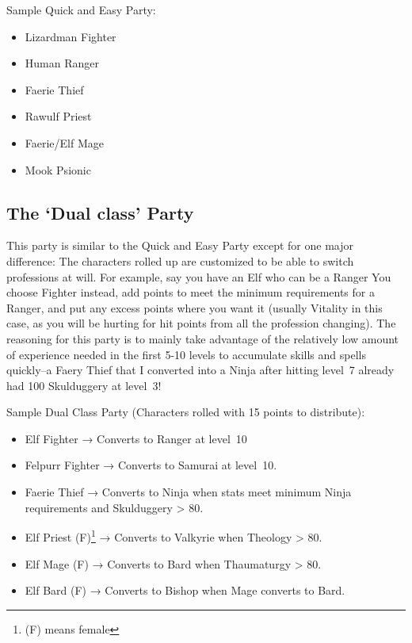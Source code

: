 \documentclass[12pt]{article}
\providecommand{\tightlist}{%
  \setlength{\itemsep}{0pt}\setlength{\parskip}{0pt}}
\begin{document}
Sample Quick and Easy Party:

\begin{itemize}
\tightlist
\item
  Lizardman Fighter
\item
  Human Ranger
\item
  Faerie Thief
\item
  Rawulf Priest
\item
  Faerie/Elf Mage
\item
  Mook Psionic
\end{itemize}

\subsection{\texorpdfstring{The `Dual class'
Party}{The Dual class Party}}\label{the-dual-class-party}

This party is similar to the Quick and Easy Party except for one major
difference: The characters rolled up are customized to be able to switch
professions at will. For example, say you have an Elf who can be a
Ranger You choose Fighter instead, add points to meet the minimum
requirements for a Ranger, and put any excess points where you want it
(usually Vitality in this case, as you will be hurting for hit points
from all the profession changing). The reasoning for this party is to
mainly take advantage of the relatively low amount of experience needed
in the first 5-10 levels to accumulate skills and spells quickly--a
Faery Thief that I converted into a Ninja after hitting level~7 already
had 100 Skulduggery at level~3!

Sample Dual Class Party (Characters rolled with 15 points to distribute):

\begin{itemize}
\tightlist
\item
  Elf Fighter → Converts to Ranger at level~10
\item
  Felpurr Fighter → Converts to Samurai at level~10.
\item
  Faerie Thief → Converts to Ninja when stats meet minimum Ninja
  requirements and Skulduggery \textgreater{} 80.
\item
  Elf Priest (F)\protect\footnote{(F) means female} → Converts to Valkyrie when Theology \textgreater{} 80.
\item
  Elf Mage (F) → Converts to Bard when Thaumaturgy \textgreater{} 80.
\item
  Elf Bard (F) → Converts to Bishop when Mage converts to Bard.
\end{itemize}
\end{document}
